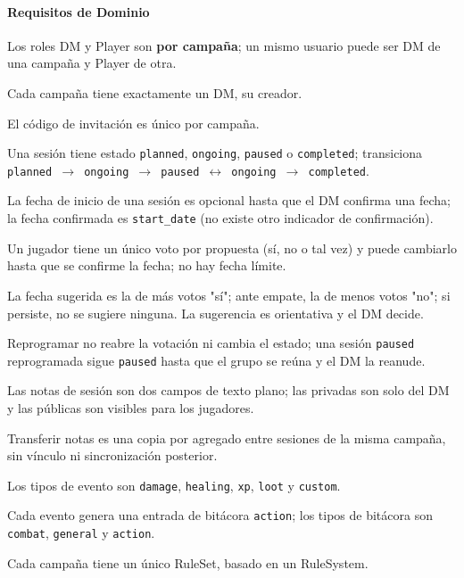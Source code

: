 \paragraph{Requisitos de Dominio}
\begin{description}[leftmargin=2.2cm,labelwidth=2cm,itemsep=2pt]
\item[RD-001] Los roles DM y Player son \textbf{por campaña}; un mismo usuario puede ser DM de una campaña y Player de otra.
\item[RD-002] Cada campaña tiene exactamente un DM, su creador.
\item[RD-003] El código de invitación es único por campaña.
\item[RD-004] Una sesión tiene estado \texttt{planned}, \texttt{ongoing}, \texttt{paused} o \texttt{completed}; transiciona \texttt{planned $\rightarrow$ ongoing $\rightarrow$ paused $\leftrightarrow$ ongoing $\rightarrow$ completed}.
\item[RD-005] La fecha de inicio de una sesión es opcional hasta que el DM confirma una fecha; la fecha confirmada es \texttt{start\_\allowbreak{}date} (no existe otro indicador de confirmación).
\item[RD-006] Un jugador tiene un único voto por propuesta (sí, no o tal vez) y puede cambiarlo hasta que se confirme la fecha; no hay fecha límite.
\item[RD-007] La fecha sugerida es la de más votos "sí"; ante empate, la de menos votos "no"; si persiste, no se sugiere ninguna. La sugerencia es orientativa y el DM decide.
\item[RD-008] Reprogramar no reabre la votación ni cambia el estado; una sesión \texttt{paused} reprogramada sigue \texttt{paused} hasta que el grupo se reúna y el DM la reanude.
\item[RD-009] Las notas de sesión son dos campos de texto plano; las privadas son solo del DM y las públicas son visibles para los jugadores.
\item[RD-010] Transferir notas es una copia por agregado entre sesiones de la misma campaña, sin vínculo ni sincronización posterior.
\item[RD-011] Los tipos de evento son \texttt{damage}, \texttt{healing}, \texttt{xp}, \texttt{loot} y \texttt{custom}.
\item[RD-012] Cada evento genera una entrada de bitácora \texttt{action}; los tipos de bitácora son \texttt{combat}, \texttt{general} y \texttt{action}.
\item[RD-013] Cada campaña tiene un único RuleSet, basado en un RuleSystem.

\end{description}
